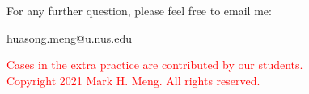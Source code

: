 \begin{frame}[fragile]{}
	\centering  
	For any further question, please feel free to email me:\vspace{10pt}
	
	huasong.meng@u.nus.edu \vspace{20pt}
	
	\begin{tcolorbox}
		\begin{center}
			\textcolor{red}{Cases in the extra practice are contributed by our students.\\\vspace{5pt}Copyright 2021 Mark H. Meng. All rights reserved.}
		\end{center}
	\end{tcolorbox}
\end{frame}
